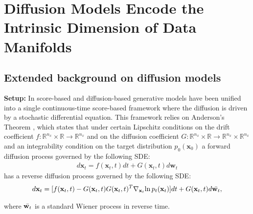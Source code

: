 
\chapter{Diffusion Models Encode the Intrinsic Dimension of Data Manifolds}

\section{Extended background on diffusion models}
\label{ch3:appendix:background}
\textbf{Setup:}  In \cite{song2020score} score-based  \cite{score_matching} and diffusion-based \cite{diffusion_models, ddpm} generative models have been unified into a single continuous-time score-based framework where the diffusion is driven by a stochastic differential equation.  This framework relies on Anderson's Theorem \cite{anderson1982reverse_time_sde}, which states that under certain Lipschitz conditions on the drift coefficient $f : \mathbb{R}^{n_x} \times \mathbb{R} \xrightarrow{} \mathbb{R}^{n_x}$ and on the diffusion coefficient $G : \mathbb{R}^{n_x} \times \mathbb{R}\xrightarrow{} \mathbb{R}^{n_x} \times \mathbb{R}^{n_x}$ and an integrability condition on the target distribution $p_0(\textbf{x}_0)$ a forward diffusion process governed by the following SDE:
\begin{gather}
\label{ch3:eq:forward_sde}
 d\textbf{x}_t = f(\textbf{x}_t,t)dt+G(\textbf{x}_t,t)d\textbf{w}_t  
\end{gather} 
has a reverse diffusion process governed by the following SDE:
\label{ch3:eq:reverse_sde}
\begin{gather}
    d\textbf{x}_t=[f(\textbf{x}_t,t)-G(\textbf{x}_t,t)G(\textbf{x}_t,t)^T\nabla_{\textbf{x}_t}{\ln{p_t(\textbf{x}_t)}}]dt + G(\textbf{x}_t,t)d\Bar{\textbf{w}_t},
\end{gather}


\noindent where $\Bar{\textbf{w}_t}$ is a standard Wiener process in reverse time. 


